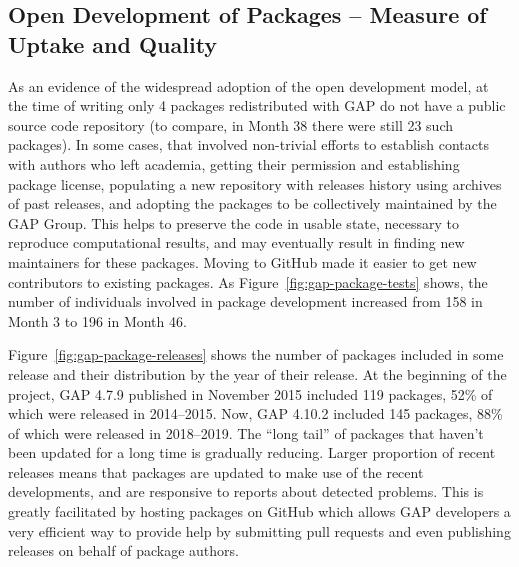 \subsection{Open Development of \GAP Packages -- Measure of Uptake
  and Quality}

As an evidence of the widespread adoption of the open development model, 
at the time of writing only 4 packages redistributed with GAP do not have a public 
source code repository (to compare, in Month 38 there were still 23 such 
packages). In some cases, that involved non-trivial efforts to establish 
contacts with authors who left academia, getting their permission and 
establishing package license, populating a new repository with releases 
history using archives of past releases, and adopting the packages to
be collectively maintained by the GAP Group. This helps to preserve the
code in usable state, necessary to reproduce computational results, and
may eventually result in finding new maintainers for these packages.
Moving to GitHub made it easier to get new contributors to existing
packages. As Figure~\ref{fig:gap-package-tests}
shows, the number of individuals involved in package development
increased from 158 in Month 3 to 196 in Month 46. 

Figure~\ref{fig:gap-package-releases} shows the number of \GAP packages
included in some \GAP release and their distribution by the year of their
release. At the beginning of the project, GAP 4.7.9 published in November
2015 included 119 packages, 52\% of which were released in 2014--2015.
Now, GAP 4.10.2 included 145 packages, 88\% of which were released in
2018--2019. The ``long tail'' of packages that haven't been updated for
a long time is gradually reducing.
Larger proportion of recent releases means that 
packages are updated to make use of the recent \GAP developments,
and are responsive to reports about detected problems.
This is greatly facilitated by hosting packages on GitHub which 
allows GAP developers a very efficient way to provide help by submitting 
pull requests and even publishing releases on behalf of package authors.

